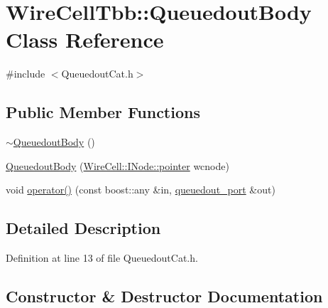 \hypertarget{class_wire_cell_tbb_1_1_queuedout_body}{}\section{Wire\+Cell\+Tbb\+:\+:Queuedout\+Body Class Reference}
\label{class_wire_cell_tbb_1_1_queuedout_body}


{\ttfamily \#include $<$Queuedout\+Cat.\+h$>$}

\subsection*{Public Member Functions}
\begin{DoxyCompactItemize}
\item 
\hyperlink{class_wire_cell_tbb_1_1_queuedout_body_afe5be4bde1d21c3e459313c78165d57c}{$\sim$\+Queuedout\+Body} ()
\item 
\hyperlink{class_wire_cell_tbb_1_1_queuedout_body_a46f5320cd0ac14d1a42738dcc5e5ba65}{Queuedout\+Body} (\hyperlink{class_wire_cell_1_1_interface_a09c548fb8266cfa39afb2e74a4615c37}{Wire\+Cell\+::\+I\+Node\+::pointer} wcnode)
\item 
void \hyperlink{class_wire_cell_tbb_1_1_queuedout_body_abce2369209a7a6834ec39deaa9e2cafd}{operator()} (const boost\+::any \&in, \hyperlink{namespace_wire_cell_tbb_a1812565243cb4597d2215ad672e1e991}{queuedout\+\_\+port} \&out)
\end{DoxyCompactItemize}


\subsection{Detailed Description}


Definition at line 13 of file Queuedout\+Cat.\+h.



\subsection{Constructor \& Destructor Documentation}
\mbox{\label{class_wire_cell_tbb_1_1_queuedout_body_afe5be4bde1d21c3e459313c78165d57c}} 
